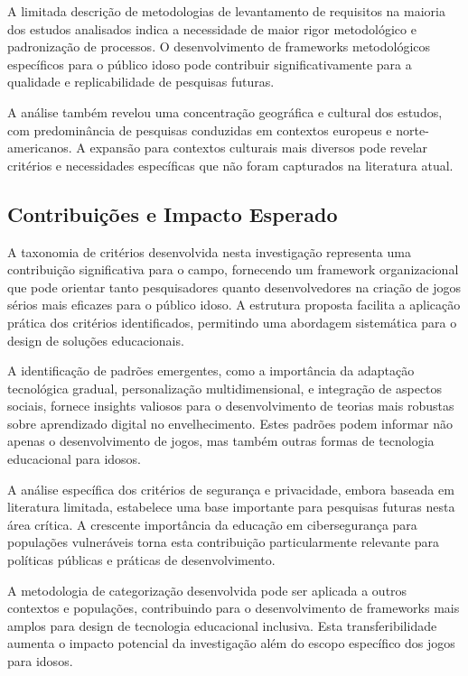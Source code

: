 \begin{table}[H]
A limitada descrição de metodologias de levantamento de requisitos na maioria dos estudos analisados indica a necessidade de maior rigor metodológico e padronização de processos. O desenvolvimento de frameworks metodológicos específicos para o público idoso pode contribuir significativamente para a qualidade e replicabilidade de pesquisas futuras.

A análise também revelou uma concentração geográfica e cultural dos estudos, com predominância de pesquisas conduzidas em contextos europeus e norte-americanos. A expansão para contextos culturais mais diversos pode revelar critérios e necessidades específicas que não foram capturados na literatura atual.

\subsection{Contribuições e Impacto Esperado}
\label{subsec:contribuicoes}

A taxonomia de critérios desenvolvida nesta investigação representa uma contribuição significativa para o campo, fornecendo um framework organizacional que pode orientar tanto pesquisadores quanto desenvolvedores na criação de jogos sérios mais eficazes para o público idoso. A estrutura proposta facilita a aplicação prática dos critérios identificados, permitindo uma abordagem sistemática para o design de soluções educacionais.

A identificação de padrões emergentes, como a importância da adaptação tecnológica gradual, personalização multidimensional, e integração de aspectos sociais, fornece insights valiosos para o desenvolvimento de teorias mais robustas sobre aprendizado digital no envelhecimento. Estes padrões podem informar não apenas o desenvolvimento de jogos, mas também outras formas de tecnologia educacional para idosos.

A análise específica dos critérios de segurança e privacidade, embora baseada em literatura limitada, estabelece uma base importante para pesquisas futuras nesta área crítica. A crescente importância da educação em cibersegurança para populações vulneráveis torna esta contribuição particularmente relevante para políticas públicas e práticas de desenvolvimento.

A metodologia de categorização desenvolvida pode ser aplicada a outros contextos e populações, contribuindo para o desenvolvimento de frameworks mais amplos para design de tecnologia educacional inclusiva. Esta transferibilidade aumenta o impacto potencial da investigação além do escopo específico dos jogos para idosos.


\end{table}
